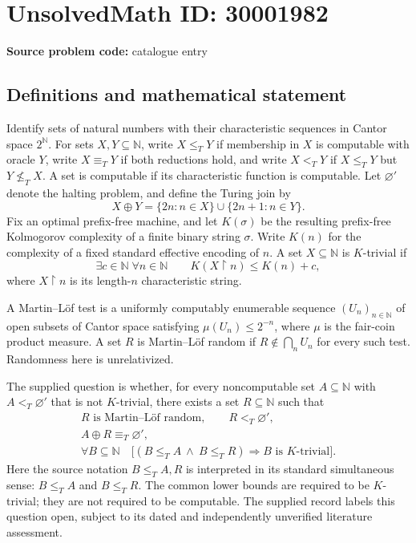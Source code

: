 \documentclass[11pt]{article}
\newcommand{\N}{\mathbb{N}}
\begin{document}
\section*{UnsolvedMath ID: 30001982}
\textbf{Source problem code:} catalogue entry
\subsection{Definitions and mathematical statement}
Identify sets of natural numbers with their characteristic sequences in Cantor space \(2^{\N}\). For sets \(X,Y\subseteq\N\), write \(X\leq_T Y\) if membership in \(X\) is computable with oracle \(Y\), write \(X\equiv_T Y\) if both reductions hold, and write \(X<_T Y\) if \(X\leq_T Y\) but \(Y\not\leq_T X\). A set is computable if its characteristic function is computable. Let \(\varnothing'\) denote the halting problem, and define the Turing join by
\[
X\oplus Y=\{2n:n\in X\}\cup\{2n+1:n\in Y\}.
\]
Fix an optimal prefix-free machine, and let \(K(\sigma)\) be the resulting prefix-free Kolmogorov complexity of a finite binary string \(\sigma\). Write \(K(n)\) for the complexity of a fixed standard effective encoding of \(n\). A set \(X\subseteq\N\) is \(K\)-trivial if
\[
\exists c\in\N\;\forall n\in\N\qquad K(X\upharpoonright n)\leq K(n)+c,
\]
where \(X\upharpoonright n\) is its length-\(n\) characteristic string.

A Martin--L\"of test is a uniformly computably enumerable sequence \((U_n)_{n\in\N}\) of open subsets of Cantor space satisfying \(\mu(U_n)\leq 2^{-n}\), where \(\mu\) is the fair-coin product measure. A set \(R\) is Martin--L\"of random if \(R\notin\bigcap_n U_n\) for every such test. Randomness here is unrelativized.

The supplied question is whether, for every noncomputable set \(A\subseteq\N\) with \(A<_T\varnothing'\) that is not \(K\)-trivial, there exists a set \(R\subseteq\N\) such that
\[
\begin{gathered}
R\text{ is Martin--L\"of random},\qquad R<_T\varnothing',\\
A\oplus R\equiv_T\varnothing',\\
\forall B\subseteq\N\quad
\bigl[(B\leq_T A\ \land\ B\leq_T R)
\Longrightarrow B\text{ is }K\text{-trivial}\bigr].
\end{gathered}
\]
Here the source notation \(B\leq_T A,R\) is interpreted in its standard simultaneous sense: \(B\leq_T A\) and \(B\leq_T R\). The common lower bounds are required to be \(K\)-trivial; they are not required to be computable. The supplied record labels this question open, subject to its dated and independently unverified literature assessment.
\end{document}
